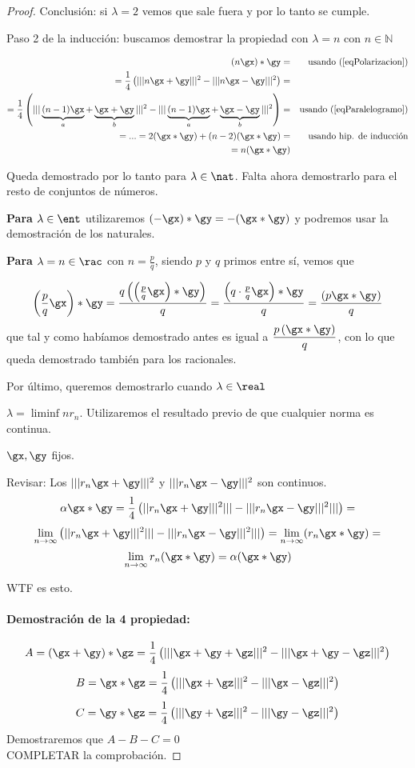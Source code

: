 \documentclass{apuntes}
\begin{document}
\begin{proof}
Conclusión: si $\lambda = 2$ vemos que sale fuera y por lo tanto se cumple.

Paso 2 de la inducción: buscamos demostrar la propiedad con $\lambda = n$ con $n \in \mathbb{N}$

\begin{align*}
(n\gx)\ast\gy = && \text{usando (\ref{eqPolarizacion})} \\
= \frac{1}{4} \left(|||n\gx+\gy|||^2 - |||n\gx-\gy|||^2\right) = && \\
= \frac{1}{4} \left(|||\underbrace{(n-1)\gx}_a+\underbrace{\gx+\gy}_b|||^2 
		- ||| \underbrace{(n-1)\gx}_a+ \underbrace{\gx-\gy}_b|||^2\right)= && \text{usando (\ref{eqParalelogramo})} \\
=...=2(\gx\ast\gy) + (n-2)(\gx\ast\gy) = && \text{usando hip. de inducción}\\
= n (\gx\ast\gy)
\end{align*}

Queda demostrado por lo tanto para $\lambda \in \nat$. Falta ahora demostrarlo para el resto de conjuntos de números.

\textbf{Para $\lambda \in \ent$} utilizaremos $(-\gx) \ast \gy = - (\gx\ast\gy)$ y podremos usar la demostración de los naturales.

\textbf{Para $\lambda = n \in \rac$} con $n = \frac{p}{q}$, siendo $p$ y $q$ primos entre sí, vemos que 

\[ \left(\frac{p}{q}\gx\right)\ast\gy = \frac{q\left(\left(\frac{p}{q}\gx\right)\ast\gy\right)}{q} = \frac{\left(q\cdot\frac{p}{q}\gx\right)\ast\gy}{q} = \frac{\left(p\gx\ast\gy\right)}{q} \] que tal y como habíamos demostrado antes es igual a $ \dfrac{p\left(\gx\ast\gy\right)}{q} $, con lo que queda demostrado también para los racionales.

Por último, queremos demostrarlo cuando $\lambda \in \real$

$\lambda = \liminf{n} r_n$. Utilizaremos el resultado previo de que cualquier norma es continua.

$\gx, \gy$ fijos.

Revisar: Los $|||r_n \gx + \gy|||^2$ y  $|||r_n \gx - \gy|||^2$ son continuos.
$$\alpha \gx*\gy = \frac{1}{4}\left(||r_n \gx + \gy|||^2||| -|||r_n \gx - \gy|||^2||| \right) =$$
$$\lim_{n\to\infty} \left(||r_n \gx + \gy|||^2||| -|||r_n \gx - \gy|||^2||| \right) = \lim_{n\to\infty} (r_n\gx*\gy) = $$
$$\lim_{n\to\infty} r_n(\gx*\gy) = \alpha (\gx*\gy)$$

WTF es esto.

\paragraph{Demostración de la 4 propiedad:}
$$A = (\gx+\gy)*\gz = \frac{1}{4} \left( |||\gx+\gy+\gz|||^2 - |||\gx+\gy-\gz|||^2\right)$$
$$B =\gx*\gz = \frac{1}{4} \left( |||\gx+\gz|||^2 - |||\gx-\gz|||^2\right)$$
$$C =\gy*\gz = \frac{1}{4} \left( |||\gy+\gz|||^2 - |||\gy-\gz|||^2\right)$$
Demostraremos que $A-B-C=0$\\
COMPLETAR la comprobación.
\end{proof}
\end{document}
